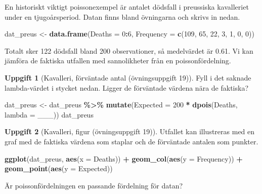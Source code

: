 \documentclass[
]{book}
\newenvironment{Shaded}{\begin{snugshade}}{\end{snugshade}}
\newcommand{\AttributeTok}[1]{\textcolor[rgb]{0.13,0.29,0.53}{#1}}
\newcommand{\DecValTok}[1]{\textcolor[rgb]{0.00,0.00,0.81}{#1}}
\newcommand{\FunctionTok}[1]{\textcolor[rgb]{0.13,0.29,0.53}{\textbf{#1}}}
\newcommand{\NormalTok}[1]{#1}
\newcommand{\OtherTok}[1]{\textcolor[rgb]{0.56,0.35,0.01}{#1}}
\newcommand{\SpecialCharTok}[1]{\textcolor[rgb]{0.81,0.36,0.00}{\textbf{#1}}}
\theoremstyle{definition}
\theoremstyle{definition}
\theoremstyle{definition}
\newtheorem{exercise}{Uppgift}[chapter]
\theoremstyle{definition}
\theoremstyle{remark}
\begin{document}
En historiskt viktigt poissonexempel är antalet dödsfall i preussiska kavalleriet under en tjugoårsperiod. Datan finns bland övningarna och skrivs in nedan.

\begin{Shaded}
\begin{Highlighting}[]
\NormalTok{dat\_preus }\OtherTok{\textless{}{-}} \FunctionTok{data.frame}\NormalTok{(}\AttributeTok{Deaths =} \DecValTok{0}\SpecialCharTok{:}\DecValTok{6}\NormalTok{,}
                        \AttributeTok{Frequency =} \FunctionTok{c}\NormalTok{(}\DecValTok{109}\NormalTok{, }\DecValTok{65}\NormalTok{, }\DecValTok{22}\NormalTok{, }\DecValTok{3}\NormalTok{, }\DecValTok{1}\NormalTok{, }\DecValTok{0}\NormalTok{, }\DecValTok{0}\NormalTok{))}
\end{Highlighting}
\end{Shaded}

Totalt sker 122 dödsfall bland 200 observationer, så medelvärdet är 0.61. Vi kan jämföra de faktiska utfallen med sannolikheter från en poissonfördelning.

\begin{exercise}[Kavalleri, förväntade antal (övningsuppgift 19)]

Fyll i det saknade lambda-värdet i stycket nedan. Ligger de förväntade värdena nära de faktiska?

\begin{Shaded}
\begin{Highlighting}[]
\NormalTok{dat\_preus }\OtherTok{\textless{}{-}}\NormalTok{ dat\_preus }\SpecialCharTok{\%\textgreater{}\%} 
  \FunctionTok{mutate}\NormalTok{(}\AttributeTok{Expected =} \DecValTok{200} \SpecialCharTok{*} \FunctionTok{dpois}\NormalTok{(Deaths, }\AttributeTok{lambda =}\NormalTok{ \_\_\_))}
\NormalTok{dat\_preus}
\end{Highlighting}
\end{Shaded}

\end{exercise}

\begin{exercise}[Kavalleri, figur (övningsuppgift 19)]
Utfallet kan illustreras med en graf med de faktiska värdena som staplar och de förväntade antalen som punkter.

\begin{Shaded}
\begin{Highlighting}[]
\FunctionTok{ggplot}\NormalTok{(dat\_preus, }\FunctionTok{aes}\NormalTok{(}\AttributeTok{x =}\NormalTok{ Deaths)) }\SpecialCharTok{+}
  \FunctionTok{geom\_col}\NormalTok{(}\FunctionTok{aes}\NormalTok{(}\AttributeTok{y =}\NormalTok{ Frequency)) }\SpecialCharTok{+}
  \FunctionTok{geom\_point}\NormalTok{(}\FunctionTok{aes}\NormalTok{(}\AttributeTok{y =}\NormalTok{ Expected))}
\end{Highlighting}
\end{Shaded}

Är poissonfördelningen en passande fördelning för datan?
\end{exercise}
\end{document}
